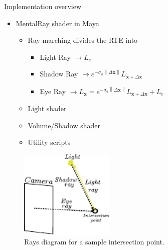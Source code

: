 \documentclass{beamer}
\newcommand{\x}{\mathbf{x}}
\newcommand{\deltax}{\left \|  \Delta \x \right \|}
\begin{document}
\begin{frame}{Implementation overview}

\begin{multicols}{2}
\begin{itemize}
\setlength\itemsep{0.5em}
\item MentalRay shader in Maya
	\begin{itemize}
	\setlength\itemsep{0.5em}
	\item Ray marching divides the RTE into
		\begin{itemize}
		\setlength\itemsep{0.5em}
		\item Light Ray $\rightarrow L_e$
		\item Shadow Ray $\rightarrow e^{-\sigma_a \deltax} L_{\x + \Delta\x}$
		\item Eye Ray $\rightarrow L_{\x} = e^{-\sigma_a \deltax} L_{\x + \Delta\x} + L_e$
		\end{itemize}
	\item Light shader
	\item Volume/Shadow shader
	\item Utility scripts		
	\end{itemize}
\end{itemize}

\begin{figure}[t!]
\begin{center}
\includegraphics[width=0.4\textwidth]{img/mental_ray_model} 
\caption*{\tiny{Rays diagram for a sample intersection point.}}
\end{center}
\end{figure}
\end{multicols}

\end{frame}
\end{document}
